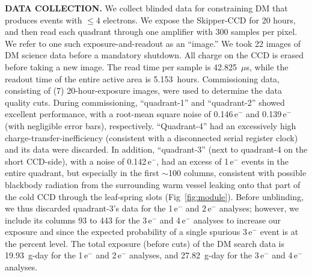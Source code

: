 \documentclass[aps,prl,twocolumn,showpacs,superscriptaddress,preprintnumbers]{revtex4-1}
\newcommand{\unit}[1]{\ensuremath{\mathrm{\,#1}}\xspace}
\newcommand{\e}{\unit{e^{-}}}
\begin{document}
\noindent\textbf{DATA COLLECTION.}
We collect blinded data for constraining DM that produces events with $\le 4$ electrons. 
We expose the Skipper-CCD for 20 hours, and then read each quadrant through one amplifier with 300 samples per pixel. We refer to one such exposure-and-readout as an ``image.''  We took 22 images of DM science data before a mandatory shutdown. All charge on the CCD is erased before taking a new image.  The read time per sample is 42.825~$\mu$s, while the readout time of the entire active area is 5.153~hours. 
Commissioning data, consisting of (7) 20-hour-exposure images, were used to determine the data quality cuts.  
During commissioning, ``quadrant-1'' and ``quadrant-2'' showed excellent performance, with a root-mean square noise of 0.146\e and 0.139\e (with negligible error bars), respectively. 
``Quadrant-4'' had an excessively high charge-transfer-inefficiency (consistent with a disconnected serial register clock) and its data were discarded. In addition, ``quadrant-3'' (next to quadrant-4 on the short CCD-side), with a noise of 0.142\e, had an excess of 1\e events in the entire quadrant, but especially in the first $\sim$100 columns, consistent with possible blackbody radiation from the surrounding warm vessel leaking onto that part of the cold CCD through the leaf-spring slots (Fig~\ref{fig:module}).  Before unblinding, we thus discarded quadrant-3's data for the 1\e and 2\e analyses; however, we include its columns 93 to 443 for the 3\e and 4\e analyses to increase our exposure and since the expected probability of a single spurious 3\e event is at the percent level. The total exposure (before cuts) of the DM search data is 19.93~g-day for the 1\e and 2\e analyses, and 27.82~g-day for the 3\e and 4\e analyses.
\end{document}
